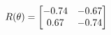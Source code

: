 \documentclass[preview]{standalone}
\begin{document}
\begin{align*}
\special{dvisvgm:raw <g id='unique000'>}R(\theta) = \begin{bmatrix}-0.74 & -0.67\\0.67 & -0.74\end{bmatrix}\special{dvisvgm:raw </g>}
\end{align*}
\end{document}
